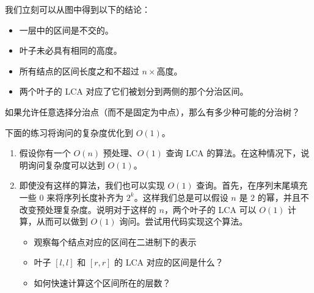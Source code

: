 我们立刻可以从图中得到以下的结论：

\begin{property}[分治树的性质]
    \begin{itemize}
    \item 一层中的区间是不交的。
    \item 叶子未必具有相同的高度。
    \item 所有结点的区间长度之和不超过 $n\times \text{高度}$。
    \item 两个叶子的 LCA 对应了它们被划分到两侧的那个分治区间。
\end{itemize}
\end{property}
\begin{exercise}[组合数学复习]
    如果允许任意选择分治点（而不是固定为中点），那么有多少种可能的分治树？
\end{exercise}


下面的练习将询问的复杂度优化到 $O(1)$。

\begin{exercise}[优化二区间合并的询问复杂度]\label{exercise:optimize-query-complexity-of-two-interval-merge}
    \begin{enumerate}
        \item 假设你有一个 $O(n)$ 预处理、$O(1)$ 查询 LCA 的算法。在这种情况下，说明询问复杂度可以达到 $O(1)$。
        \item 即使没有这样的算法，我们也可以实现 $O(1)$ 查询。首先，在序列末尾填充一些 $0$ 来将序列长度补齐为 $2^k$。这样我们总是可以假设 $n$ 是 $2$ 的幂，并且不改变预处理复杂度。说明对于这样的 $n$，两个叶子的 LCA 可以 $O(1)$ 计算，从而可以做到 $O(1)$ 询问。尝试用代码实现这个算法。
        \begin{itemize}
            \item \begin{hint}[提示一]
                观察每个结点对应的区间在二进制下的表示
            \end{hint}
            \item \begin{hint}[提示二]
                叶子 $[l,l]$ 和 $[r,r]$ 的 LCA 对应的区间是什么？
                
            \end{hint}
            \item \begin{hint}[提示三]
                如何快速计算这个区间所在的层数？
            \end{hint}
        \end{itemize}
    \end{enumerate}
\end{exercise}

